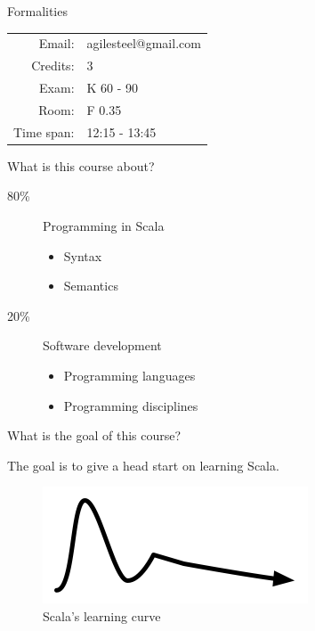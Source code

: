 \begin{frame}{Formalities}
\begin{center}
\begin{tabular}{rl}
Email: & agilesteel@gmail.com\\
Credits: & 3\\
Exam: & K 60 - 90\\
Room: & F 0.35\\
Time span: & 12:15 - 13:45\\
\end{tabular}
\end{center}
\end{frame}
\begin{frame}{What is this course about?}
\begin{description}
\item[80\%] Programming in Scala
\begin{itemize}
	\item Syntax
	\item Semantics
\end{itemize}
\pause
\item[20\%] Software development
\begin{itemize}
 	\item Programming languages
 	\item Programming disciplines
\end{itemize}
\end{description}
\end{frame}
\begin{frame}{What is the goal of this course?}
\begin{center}
The goal is to give a head start on learning Scala.
\pause
\begin{figure}[ht]
	\centering
  \includegraphics{resources/ScalaComplexity.png}
	\\Scala's learning curve
\end{figure}
\end{center}
\end{frame}